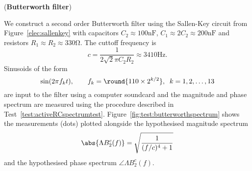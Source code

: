 \begin{test}\label{test:butterworthfilter}
(\textbf{Butterworth filter})

We construct a second order Butterworth filter using the Sallen-Key circuit from Figure~\ref{elec:sallenkey} with capacitors $C_2 \approx 100\si{\nano\farad}$, $C_1 \approx 2C_2 \approx 200\si{\nano\farad}$ and resistors $R_1 \approx R_2 \approx 330\si{\ohm}$.  The cuttoff frequency is
\[
c = \frac{1}{2\sqrt{2} \pi C_2 R_2} \approx 3410\si{\hertz}.
\]
Sinusoids of the form
\[
\sin( 2 \pi f_k t ), \qquad f_k = \round{110 \times 2^{k/2}}, \;\; k = 1,2,\dots,13
\]
are input to the filter using a computer soundcard and the magnitude and phase spectrum are measured using the procedure described in Test~\ref{test:activeRCspectrumtest}.  Figure~\ref{fig:test:butterworthspectrum} shows the measurements (dots) plotted alongside the hypothesised magnitude spectrum
\[
\abs{\Lambda B_{2}^c(f)} = \sqrt{\frac{1}{(f/c)^4 + 1}}
\]
and the hypothesised phase spectrum $\angle{\Lambda B_{2}^c(f)}$.

% 
\end{test}

